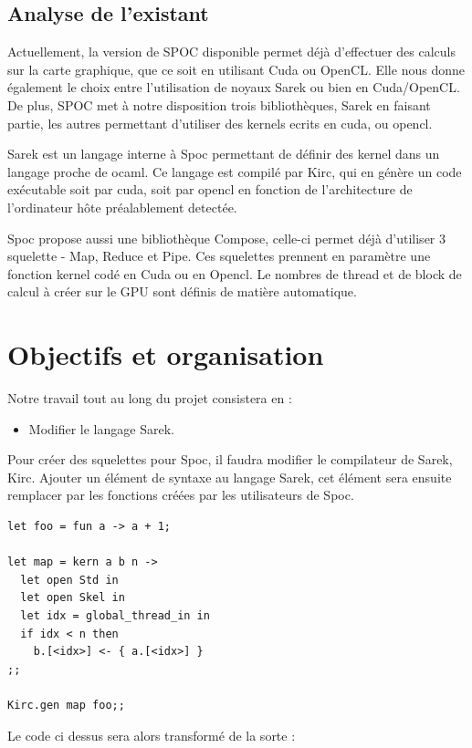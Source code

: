 \documentclass{report}
\begin{document}
\section{Analyse de l'existant}
Actuellement, la version de SPOC disponible permet déjà d’effectuer des calculs sur la carte graphique, que ce soit en utilisant Cuda ou OpenCL. Elle nous donne également le choix entre l’utilisation de noyaux Sarek ou bien en Cuda/OpenCL. De plus, SPOC met à notre disposition trois bibliothèques, Sarek en faisant partie, les autres permettant d’utiliser des kernels ecrits en cuda, ou opencl.\newline

Sarek est un langage interne à Spoc permettant de définir des kernel dans un langage proche de ocaml. Ce langage est compilé par Kirc, qui en génère un code exécutable soit par cuda, soit par opencl en fonction de l’architecture de l’ordinateur hôte préalablement detectée.

Spoc propose aussi une bibliothèque Compose, celle-ci permet déjà d’utiliser 3 squelette - Map, Reduce et Pipe. Ces squelettes prennent en paramètre une fonction kernel codé en Cuda ou en Opencl. Le nombres de thread et de block de calcul à créer sur le GPU sont définis de matière automatique. 
  
\chapter{Objectifs et organisation}

Notre travail tout au long du projet consistera en :
\begin{itemize}
\item Modifier le langage Sarek.
\end{itemize}

Pour créer des squelettes pour Spoc, il faudra modifier le compilateur de Sarek, Kirc. Ajouter un élément de syntaxe au langage Sarek, cet élément sera ensuite remplacer par les fonctions créées par les utilisateurs de Spoc. 

\begin{lstlisting}
let foo = fun a -> a + 1;

let map = kern a b n ->
  let open Std in
  let open Skel in
  let idx = global_thread_in in
  if idx < n then
    b.[<idx>] <- { a.[<idx>] }
;;

Kirc.gen map foo;; 
\end{lstlisting}

Le code ci dessus sera alors transformé de la sorte :
\end{document}
